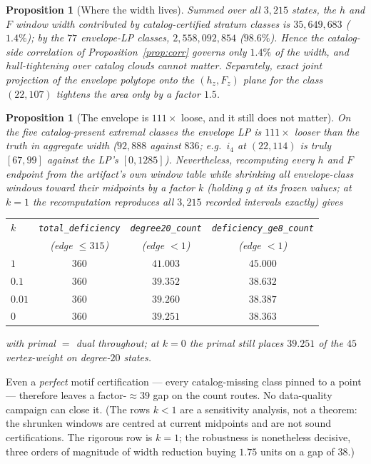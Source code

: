 \documentclass[11pt]{article}
\newtheorem{proposition}[theorem]{Proposition}
\theoremstyle{definition}
\begin{document}
\begin{proposition}[Where the width lives]\label{prop:where}
Summed over all $3{,}215$ states, the $h$ and $F$ window width contributed by
catalog-certified stratum classes is $35{,}649{,}683$ ($1.4\%$); by the $77$
envelope-LP classes, $2{,}558{,}092{,}854$ ($98.6\%$). Hence the catalog-side
correlation of Proposition~\ref{prop:corr} governs only $1.4\%$ of the width,
and hull-tightening over catalog clouds cannot matter. Separately, exact joint
projection of the envelope polytope onto the $(h_z,F_z)$ plane for the class
$(22,107)$ tightens the area only by a factor $1.5$.
\end{proposition}

\begin{proposition}[The envelope is $111\times$ loose, and it still does not
matter]\label{prop:shrink}
On the five catalog-present extremal classes the envelope LP is $111\times$
looser than the truth in aggregate width ($92{,}888$ against $836$; e.g.\
$i_4$ at $(22,114)$ is truly $[67,99]$ against the LP's $[0,1285]$).
Nevertheless, recomputing every $h$ and $F$ endpoint from the artifact's own
window table while shrinking all envelope-class windows toward their midpoints
by a factor $k$ (holding $g$ at its frozen values; at $k=1$ the recomputation
reproduces all $3{,}215$ recorded intervals exactly) gives
\begin{center}
\begin{tabular}{lccc}
\toprule
$k$ & \texttt{total\_deficiency} & \texttt{degree20\_count} & \texttt{deficiency\_ge8\_count}\\
 & (edge $\le315$) & (edge $<1$) & (edge $<1$)\\
\midrule
$1$ & $360$ & $41.003$ & $45.000$\\
$0.1$ & $360$ & $39.352$ & $38.632$\\
$0.01$ & $360$ & $39.260$ & $38.387$\\
$0$ & $360$ & $39.251$ & $38.363$\\
\bottomrule
\end{tabular}
\end{center}
with primal $=$ dual throughout; at $k=0$ the primal still places $39.251$ of
the $45$ vertex-weight on degree-$20$ states.
\end{proposition}

Even a \emph{perfect} motif certification --- every catalog-missing class pinned
to a point --- therefore leaves a factor-$\approx39$ gap on the count routes. No
data-quality campaign can close it. (The rows $k<1$ are a sensitivity analysis,
not a theorem: the shrunken windows are centred at current midpoints and are not
sound certifications. The rigorous row is $k=1$; the robustness is nonetheless
decisive, three orders of magnitude of width reduction buying $1.75$ units on a
gap of $38$.)
\end{document}
